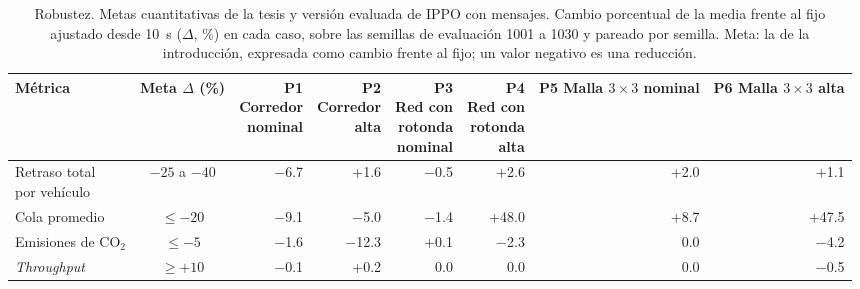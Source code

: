 \begin{table}[H]
\centering
\footnotesize
\setlength{\tabcolsep}{3pt}
\begin{tabular}{lcrrrrrr}
\toprule
Métrica & \makecell{Meta\\$\Delta$ (\%)} & \makecell{P1\\Corredor\\nominal} & \makecell{P2\\Corredor\\alta} & \makecell{P3\\Red con\\rotonda\\nominal} & \makecell{P4\\Red con\\rotonda\\alta} & \makecell{P5\\Malla $3 \times 3$\\nominal} & \makecell{P6\\Malla $3 \times 3$\\alta} \\
\midrule
\makecell[l]{Retraso total\\por vehículo} & $-25$ a $-40$ & $-$6.7 & +1.6 & $-$0.5 & +2.6 & +2.0 & +1.1 \\
Cola promedio & $\leq -20$ & $-$9.1 & $-$5.0 & $-$1.4 & +48.0 & +8.7 & +47.5 \\
Emisiones de CO$_2$ & $\leq -5$ & $-$1.6 & $-$12.3 & +0.1 & $-$2.3 & 0.0 & $-$4.2 \\
\textit{Throughput} & $\geq +10$ & $-$0.1 & +0.2 & 0.0 & 0.0 & 0.0 & $-$0.5 \\
\bottomrule
\end{tabular}
\caption[Robustez: metas cuantitativas frente al fijo ajustado desde 10~s]{Robustez. Metas cuantitativas de la tesis y versión evaluada de IPPO con mensajes. Cambio porcentual de la media frente al fijo ajustado desde 10~s ($\Delta$, \%) en cada caso, sobre las semillas de evaluación 1001 a 1030 y pareado por semilla. Meta: la de la introducción, expresada como cambio frente al fijo; un valor negativo es una reducción.}
\label{tab:robustez-plan2-metas}
\end{table}
